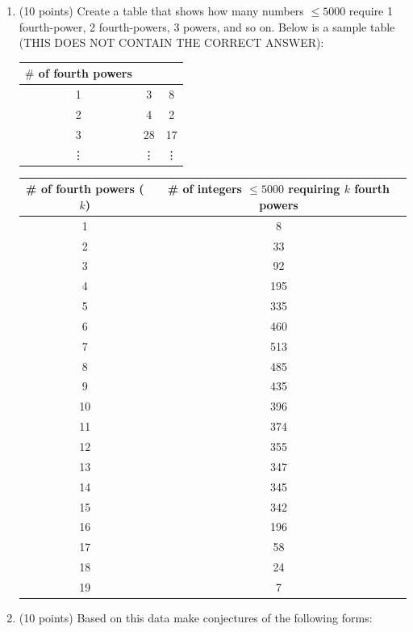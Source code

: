 \documentclass[12pt]{article}
\begin{document}
\begin{enumerate}
\begin{enumerate}
\item
(10 points)
Create a table that shows how many numbers $\leq 5000$ require 1 fourth-power, 2 fourth-powers, 
3 powers, and so on.  Below is a sample table (THIS DOES NOT CONTAIN THE CORRECT ANSWER):
\begin{center}
    \begin{tabular}{|c|c|c|}
     \hline  $\# $ of fourth powers\\ \hline
        1 & 3 & 8 \\
        2 & 4 & 2 \\
        3 & 28 & 17 \\
        \vdots & \vdots &\vdots \\ \hline
    \end{tabular}
\end{center}
\begin{table}[h]
\centering
\begin{tabular}{|c|c|}
\hline
\textbf{\# of fourth powers ($k$)} & 
\textbf{\# of integers $\le 5000$ requiring $k$ fourth powers} \\
\hline
1 & 8 \\ \hline
2 & 33 \\ \hline
3 & 92 \\ \hline
4 & 195 \\ \hline
5 & 335 \\ \hline
6 & 460 \\ \hline
7 & 513 \\ \hline
8 & 485 \\ \hline
9 & 435 \\ \hline
10 & 396 \\ \hline
11 & 374 \\ \hline
12 & 355 \\ \hline
13 & 347 \\ \hline
14 & 345 \\ \hline
15 & 342 \\ \hline
16 & 196 \\ \hline
17 & 58 \\ \hline
18 & 24 \\ \hline
19 & 7 \\ \hline
\end{tabular}
\end{table}

\item 
(10 points) Based on this data make conjectures of the following forms:


\end{enumerate}
\end{enumerate}
\end{document}

